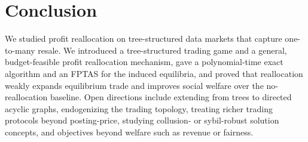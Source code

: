 \section{Conclusion}
\label{sec:conclusion}

We studied profit reallocation on tree-structured data markets that capture one-to-many resale. We introduced a tree-structured trading game and a general, budget-feasible profit reallocation mechanism, gave a polynomial-time exact algorithm and an FPTAS for the induced equilibria, and proved that reallocation weakly expands equilibrium trade and improves social welfare over the no-reallocation baseline. Open directions include extending from trees to directed acyclic graphs, endogenizing the trading topology, treating richer trading protocols beyond posting-price, studying collusion- or sybil-robust solution concepts, and objectives beyond welfare such as revenue or fairness.
